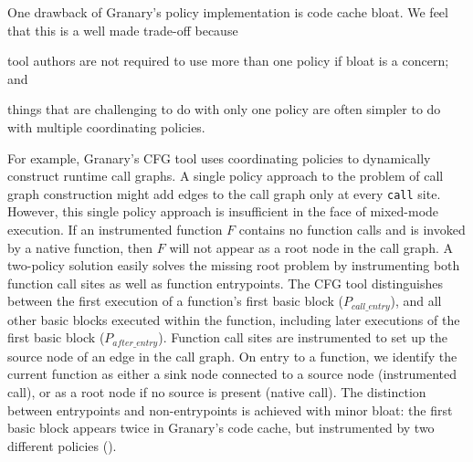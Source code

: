 \documentclass[preprint]{sigplanconf}
\begin{document}
One drawback of Granary's policy implementation is code cache bloat. We feel that this is a well made trade-off because \begin{inparaenum}[i)]
	\item tool authors are not required to use more than one policy if bloat is a concern; and
	\item things that are challenging to do with only one policy are often simpler to do with multiple coordinating policies.
\end{inparaenum} For example, Granary's CFG tool uses coordinating policies to dynamically construct runtime call graphs. A single policy approach to the problem of call graph construction might add edges to the call graph only at every \texttt{call} site. However, this single policy approach is insufficient in the face of mixed-mode execution. If an instrumented function $F$ contains no function calls and is invoked by a native function, then $F$ will not appear as a root node in the call graph. A two-policy solution easily solves the missing root problem by instrumenting both function call sites as well as function entrypoints. The CFG tool distinguishes between the first execution of a function's first basic block ($P_{call\_entry}$), and all other basic blocks executed within the function, including later executions of the first basic block ($P_{after\_entry}$). Function call sites are instrumented to set up the source node of an edge in the call graph. On entry to a function, we identify the current function as either a sink node connected to a source node (instrumented call), or as a root node if no source is present (native call). The distinction between entrypoints and non-entrypoints is achieved with minor bloat: the first basic block appears twice in Granary's code cache, but instrumented by two different policies ().


\end{document}

